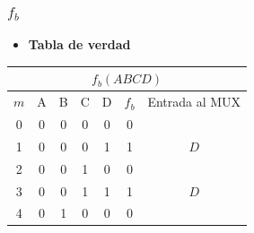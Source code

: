 \subsubsection{$f_b$}
\begin{itemize}[nosep]\item\textbf{Tabla de verdad}\end{itemize}
\begin{center}
\begin{tabular}{ccccccc}
\multicolumn{7}{c}{\cellcolor[HTML]{FFFFC7}$f_b(ABCD)$}                                                                                                                                                                                                            \\ \hline
\multicolumn{1}{c|}{\cellcolor[HTML]{9AFF99}$m$} & \cellcolor[HTML]{ECF4FF}A & \cellcolor[HTML]{ECF4FF}B & \cellcolor[HTML]{ECF4FF}C & \multicolumn{1}{c|}{\cellcolor[HTML]{ECF4FF}D} & \multicolumn{1}{c|}{\cellcolor[HTML]{FFCCC9}$f_b$} & Entrada al MUX        \\ \hline
\multicolumn{1}{c|}{0}                           & 0                         & 0                         & 0                         & \multicolumn{1}{c|}{0}                         & \multicolumn{1}{c|}{0}                             &                       \\
\multicolumn{1}{c|}{1}                           & 0                         & 0                         & 0                         & \multicolumn{1}{c|}{1}                         & \multicolumn{1}{c|}{1}                             & \multirow{-2}{*}{$D$} \\ \hline
\multicolumn{1}{c|}{2}                           & 0                         & 0                         & 1                         & \multicolumn{1}{c|}{0}                         & \multicolumn{1}{c|}{0}                             &                       \\
\multicolumn{1}{c|}{3}                           & 0                         & 0                         & 1                         & \multicolumn{1}{c|}{1}                         & \multicolumn{1}{c|}{1}                             & \multirow{-2}{*}{$D$} \\ \hline
\multicolumn{1}{c|}{4}                           & 0                         & 1                         & 0                         & \multicolumn{1}{c|}{0}                         & \multicolumn{1}{c|}{0}                             &                       \\

\end{tabular}
\end{center}
